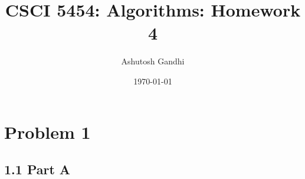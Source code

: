 \documentclass[12pt]{article}
\title{CSCI 5454: Algorithms: Homework 4}
\author{Ashutosh Gandhi}
\date{\today}
\begin{document}
\maketitle

\section*{Problem 1}


\subsection*{1.1 Part A} 

\vspace{10pt}

\end{document}
